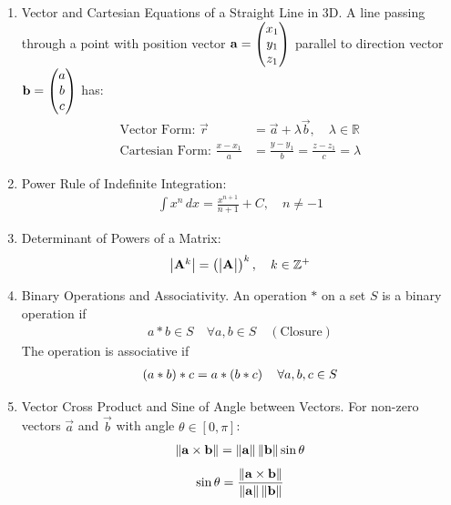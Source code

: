 \begin{enumerate}[label=\thesubsection.\arabic*, ref=\thesubsection.\theenumi]
		\item Vector and Cartesian Equations of a Straight Line in 3D.
		A line passing through a point with position vector $\mathbf{a} = \begin{pmatrix}x_1 \\ y_1 \\ z_1\end{pmatrix}$ parallel to direction vector $\mathbf{b} = \begin{pmatrix}a \\ b \\ c\end{pmatrix}$ has:
		\begin{align}
			\text{Vector Form: } \vec{r} &= \vec{a} + \lambda \vec{b}, \quad \lambda \in \mathbb{R} \label{eq:CBSE12-2019-line_vec} \\
			\text{Cartesian Form: } \frac{x - x_1}{a} &= \frac{y - y_1}{b} = \frac{z - z_1}{c} = \lambda \label{eq:CBSE12-2019-line_cart}
		\end{align}
		
		\item Power Rule of Indefinite Integration:
		\begin{align}
			\int x^n \, dx = \frac{x^{n+1}}{n+1} + C, \quad n \neq -1 \label{eq:CBSE12-2019-int_power}
		\end{align}
		
		\item Determinant of Powers of a Matrix:
		\begin{align}
			\begin{vmatrix}\mathbf{A}^k\end{vmatrix} = \left(\begin{vmatrix}\mathbf{A}\end{vmatrix}\right)^k, \quad k \in \mathbb{Z}^+ \label{eq:CBSE12-2019-det_power}
		\end{align}
		
		\item Binary Operations and Associativity.
		An operation $*$ on a set $S$ is a binary operation if
		\begin{align}
			a * b \in S \quad \forall a, b \in S \quad (\text{Closure}) \label{eq:CBSE12-2019-binary_closure}
		\end{align}
		The operation is associative if
		\begin{align}
			\left(a * b\right) * c = a * \left(b * c\right) \quad \forall a, b, c \in S \label{eq:CBSE12-2019-associative}
		\end{align}
		
		\item Vector Cross Product and Sine of Angle between Vectors.
		For non-zero vectors $\vec{a}$ and $\vec{b}$ with angle $\theta \in [0, \pi]$:
		\begin{align}
			\left\lVert\mathbf{a} \times \mathbf{b}\right\rVert = \left\lVert\mathbf{a}\right\rVert \left\lVert\mathbf{b}\right\rVert \sin\theta \label{eq:CBSE12-2019-cross_norm}
		\end{align}
		\begin{align}
			\sin\theta = \frac{\left\lVert\mathbf{a} \times \mathbf{b}\right\rVert}{\left\lVert\mathbf{a}\right\rVert \left\lVert\mathbf{b}\right\rVert} \label{eq:CBSE12-2019-sin_theta}
		\end{align}
		

\end{enumerate}
